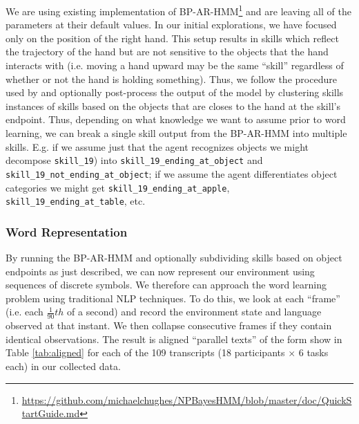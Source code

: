 \documentclass[11pt]{article}
\begin{document}
We are using existing implementation of BP-AR-HMM\footnote{\url{https://github.com/michaelchughes/NPBayesHMM/blob/master/doc/QuickStartGuide.md}} and are leaving all of the parameters at their default values. In our initial explorations, we have focused only on the position of the right hand. This setup results in skills which reflect the trajectory of the hand but are not sensitive to the objects that the hand interacts with (i.e. moving a hand upward may be the same ``skill'' regardless of whether or not the hand is holding something). Thus, we follow the procedure used by \cite{george} and optionally post-process the output of the model by clustering skills instances of skills based on the objects that are closes to the hand at the skill's endpoint. Thus, depending on what knowledge we want to assume prior to word learning, we can break a single skill output from the BP-AR-HMM into multiple skills. E.g. if we assume just that the agent recognizes objects we might decompose \texttt{skill\_19}) into \texttt{skill\_19\_ending\_at\_object} and \texttt{skill\_19\_not\_ending\_at\_object};  if we assume the agent differentiates object categories we might get \texttt{skill\_19\_ending\_at\_apple},  \texttt{skill\_19\_ending\_at\_table}, etc. 

\subsubsection{Word Representation}

By running the BP-AR-HMM and optionally subdividing skills based on object endpoints as just described, we can now represent our environment using sequences of discrete symbols. We therefore can approach the word learning problem using traditional NLP techniques. To do this, we look at each ``frame'' (i.e. each $\frac{1}{90}th$ of a second) and record the environment state and language observed at that instant. We then collapse consecutive frames if they contain identical observations. The result is aligned ``parallel texts'' of the form show in Table \ref{tab:aligned} for each of the 109 transcripts (18 participants $\times$ 6 tasks each) in our collected data. 
\end{document}
